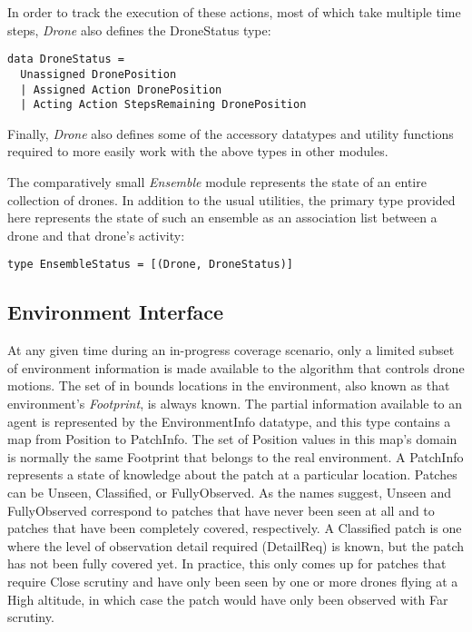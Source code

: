 In order to track the execution of these actions, most of which take multiple time steps, \textit{Drone} also defines the DroneStatus type:

\begin{verbatim}
data DroneStatus =
  Unassigned DronePosition
  | Assigned Action DronePosition
  | Acting Action StepsRemaining DronePosition
\end{verbatim}

Finally, \textit{Drone} also defines some of the accessory datatypes and utility functions required to more easily work with the above types in other modules.

The comparatively small \textit{Ensemble} module represents the state of an entire collection of drones. In addition to the usual utilities, the primary type provided here represents the state of such an ensemble as an association list between a drone and that drone's activity:

\begin{verbatim}
type EnsembleStatus = [(Drone, DroneStatus)]
\end{verbatim}

\subsection{Environment Interface}

At any given time during an in-progress coverage scenario, only a limited subset of environment information is made available to the algorithm that controls drone motions. The set of in bounds locations in the environment, also known as that environment's \textit{Footprint}, is always known. The partial information available to an agent is represented by the EnvironmentInfo datatype, and this type contains a map from Position to PatchInfo. The set of Position values in this map's domain is normally the same Footprint that belongs to the real environment. A PatchInfo represents a state of knowledge about the patch at a particular location. Patches can be Unseen, Classified, or FullyObserved. As the names suggest, Unseen and FullyObserved correspond to patches that have never been seen at all and to patches that have been completely covered, respectively. A Classified patch is one where the level of observation detail required (DetailReq) is known, but the patch has not been fully covered yet. In practice, this only comes up for patches that require Close scrutiny and have only been seen by one or more drones flying at a High altitude, in which case the patch would have only been observed with Far scrutiny.

